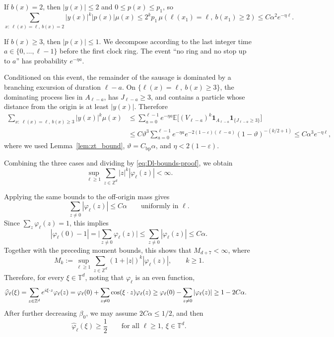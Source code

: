 \documentclass[letterpaper,11pt,reqno]{amsart}
\theoremstyle{definition}
\begin{document}
If \(b(x)=2\), then \(|y(x)|\le2\) and \(0\le p(x)\le p_1\), so
\[
\sum_{x:\ \ell(x)=\ell,\ b(x)=2}|y(x)|^k|p(x)|\mu(x)
\le
2^k p_1\,\mu(\ell(x_1)=\ell,\ b(x_1)\ge2)
\le
C\alpha^2e^{-\eta\ell}.
\]

If \(b(x)\ge3\), then \(|p(x)|\le1\). We decompose according to the last integer time
\(a\in\{0,\dots,\ell-1\}\) before the first clock ring. The event ``no ring and no stop up to \(a\)''
has probability \(e^{-\eta a}\).

Conditioned on this event, the remainder of the sausage is dominated by
a branching excursion of duration \(\ell-a\). On
\(\{\ell(x)=\ell,\ b(x)\ge3\}\), the dominating process lies in \(A_{\ell-a}\),
has \(J_{\ell-a}\ge3\), and contains a particle whose distance from the origin is at least
\(|y(x)|\). Therefore
\begin{align*}
\sum_{x:\ \ell(x)=\ell,\ b(x)\ge3}|y(x)|^k\mu(x)
&\le
\sum_{a=0}^{\ell-1}e^{-\eta a}
\mathbb E\bigl[(V_{\ell-a})^k\mathbf 1_{A_{\ell-a}}\mathbf 1_{\{J_{\ell-a}\ge3\}}\bigr]\\
&\le
C\vartheta^3\sum_{a=0}^{\ell-1}e^{-\eta a}e^{-2(1-\varepsilon)(\ell-a)}(1-\vartheta)^{-(k/2+1)}
\leq
C\alpha^3e^{-\eta\ell},
\end{align*}
where we used Lemma~\ref{lem:zt_bound}, \(\vartheta=C_{\mathrm{bp}}\alpha\), and
\(\eta<2(1-\varepsilon)\).

Combining the three cases and dividing by \eqref{eq:Dl-bounds-proof}, we obtain
\[
\sup_{\ell\ge1}\sum_{z\in\mathbb Z^d}|z|^k|\varphi_\ell(z)|<\infty.
\]

Applying the same bounds to the off-origin mass gives
\[
\sum_{z\neq0}|\varphi_\ell(z)|\le C\alpha
\qquad\text{uniformly in }\ell.
\]
Since \(\sum_z\varphi_\ell(z)=1\), this implies
\[
|\varphi_\ell(0)-1|
=
\Big|\sum_{z\neq0}\varphi_\ell(z)\Big|
\le
\sum_{z\neq0}|\varphi_\ell(z)|
\le
C\alpha.
\]
Together with the preceding moment bounds, this shows that \(M_{d+7}<\infty\), where
\[
M_{k}:=\sup_{\ell\ge1}\sum_{z\in\mathbb Z^d}(1+|z|)^{k}|\varphi_\ell(z)|,
\qquad k\geq 1.
\]
Therefore, for every \(\xi\in\mathbb T^d\), noting that $\varphi_\ell$ is an even function,
\begin{align*}
\widehat\varphi_\ell(\xi)
&=
\sum_{z\in\mathbb Z^d}e^{i\xi\cdot z}\varphi_\ell(z)
=
\varphi_\ell(0)+\sum_{z\neq0}\cos(\xi\cdot z)\varphi_\ell(z) \notag
\ge
\varphi_\ell(0)-\sum_{z\neq0}|\varphi_\ell(z)|
\ge
1-2C\alpha.
\end{align*}
After further decreasing \(\beta_0\), we may assume \(2C\alpha\le1/2\), and then
\begin{equation}\label{eq:hat-positive-half}
\widehat\varphi_\ell(\xi)\ge \frac12
\qquad\text{for all }\ell\ge1,\ \xi\in\mathbb T^d.
\end{equation}
\end{document}
